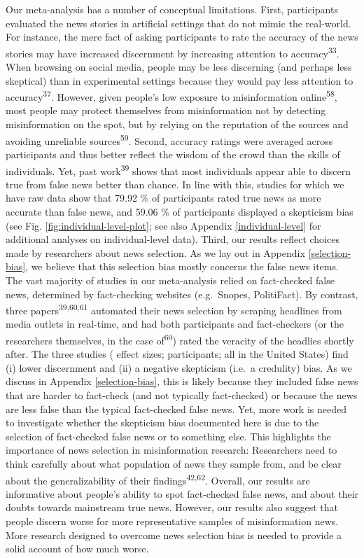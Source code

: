 \documentclass[
  doc,floatsintext]{apa6}
\begin{document}
Our meta-analysis has a number of conceptual limitations. First, participants evaluated the news stories in artificial settings that do not mimic the real-world. For instance, the mere fact of asking participants to rate the accuracy of the news stories may have increased discernment by increasing attention to accuracy\textsuperscript{33}. When browsing on social media, people may be less discerning (and perhaps less skeptical) than in experimental settings because they would pay less attention to accuracy\textsuperscript{37}. However, given people's low exposure to misinformation online\textsuperscript{58}, most people may protect themselves from misinformation not by detecting misinformation on the spot, but by relying on the reputation of the sources and avoiding unreliable sources\textsuperscript{59}. Second, accuracy ratings were averaged across participants and thus better reflect the wisdom of the crowd than the skills of individuals. Yet, past work\textsuperscript{39} shows that most individuals appear able to discern true from false news better than chance. In line with this, studies for which we have raw data show that 79.92 \% of participants rated true news as more accurate than false news, and 59.06 \% of participants displayed a skepticism bias (see Fig. \ref{fig:individual-level-plot}; see also Appendix \ref{individual-level} for additional analyses on individual-level data). Third, our results reflect choices made by researchers about news selection. As we lay out in Appendix \ref{selection-bias}, we believe that this selection bias mostly concerns the false news items. The vast majority of studies in our meta-analysis relied on fact-checked false news, determined by fact-checking websites (e.g.~Snopes, PolitiFact). By contrast, three papers\textsuperscript{39,60,61} automated their news selection by scraping headlines from media outlets in real-time, and had both participants and fact-checkers (or the researchers themselves, in the case of\textsuperscript{60}) rated the veracity of the headlies shortly after. The three studies ( effect sizes; participants; all in the United States) find (i) lower discernment and (ii) a negative skepticism (i.e.~a credulity) bias. As we discuss in Appendix \ref{selection-bias}, this is likely because they included false news that are harder to fact-check (and not typically fact-checked) or because the news are less false than the typical fact-checked false news. Yet, more work is needed to investigate whether the skepticism bias documented here is due to the selection of fact-checked false news or to something else. This highlights the importance of news selection in misinformation research: Researchers need to think carefully about what population of news they sample from, and be clear about the generalizability of their findings\textsuperscript{42,62}. Overall, our results are informative about people's ability to spot fact-checked false news, and about their doubts towards mainstream true news. However, our results also suggest that people discern worse for more representative samples of misinformation news. More research designed to overcome news selection bias is needed to provide a solid account of how much worse.
\end{document}
